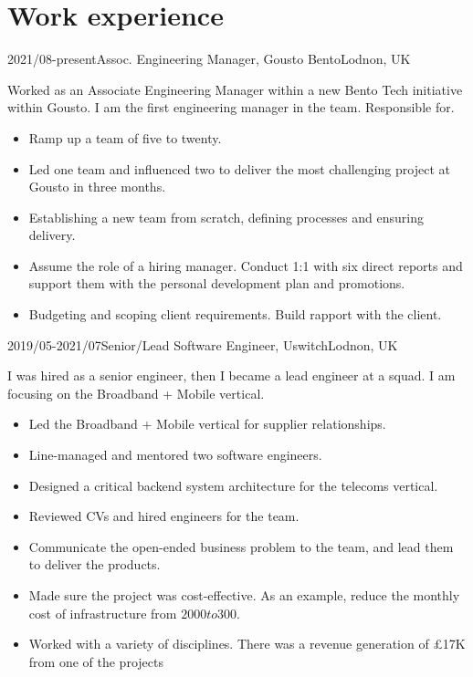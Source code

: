 \documentclass[a4paper]{twentysecondcv-english} %
\begin{document}
\section{Work experience}

\begin{twenty}
	\twentyitem
	    {2021/08-present}{Assoc. Engineering Manager, Gousto Bento}{Lodnon, UK}
    	{Worked as an Associate Engineering Manager within a new Bento Tech initiative within Gousto. I am the first engineering manager in the team. Responsible for.
        	\begin{itemize}
                \item Ramp up a team of five to twenty.
                \item Led one team and influenced two to deliver the most challenging project at Gousto in three months.
                \item Establishing a new team from scratch, defining processes and ensuring delivery.
                \item Assume the role of a hiring manager. Conduct 1:1 with six direct reports and support them with the personal development plan and promotions.
                \item Budgeting and scoping client requirements. Build rapport with the client.
            \end{itemize}}
	\twentyitem
	    {2019/05-2021/07}{Senior/Lead Software Engineer, Uswitch}{Lodnon, UK}
    	{I was hired as a senior engineer, then I became a lead engineer at a squad. I am focusing on the Broadband + Mobile vertical.
        	\begin{itemize}
                \item Led the Broadband + Mobile vertical for supplier relationships.
                \item Line-managed and mentored two software engineers.
                \item Designed a critical backend system architecture for the telecoms vertical.
                \item Reviewed CVs and hired engineers for the team.
                \item Communicate the open-ended business problem to the team, and lead them to deliver the products.
                \item Made sure the project was cost-effective. As an example, reduce the monthly cost of infrastructure from $2000 to $300.
                \item Worked with a variety of disciplines. There was a revenue generation of £17K from one of the projects

\end{itemize}}
\end{twenty}
\end{document}
